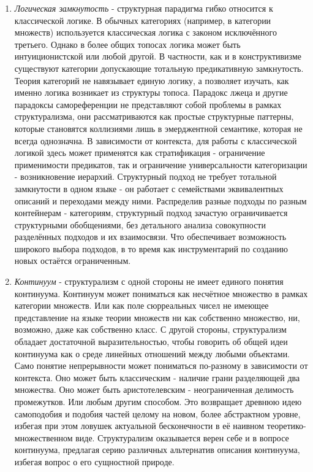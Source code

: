 \documentclass[12pt]{article}
\begin{document}
\begin{enumerate}
    \item {\it Логическая замкнутость} - структурная парадигма гибко относится к классической логике. В обычных категориях (например, в категории множеств) используется классическая логика с законом исключённого третьего. Однако в более общих топосах логика может быть интуиционистской или любой другой. В частности, как и в конструктивизме существуют категории допускающие тотальную предикативную замкнутость. Теория категорий не навязывает единую логику, а позволяет изучать, как именно логика возникает из структуры топоса. Парадокс лжеца и другие парадоксы самореференции не представляют собой проблемы в рамках структурализма, они рассматриваются как простые структурные паттерны, которые становятся коллизиями лишь в эмерджентной семантике, которая не всегда однозначна. В зависимости от контекста, для работы с классической логикой здесь может применятся как стратификация - ограничение применимости предикатов, так и ограничение универсальности категоризации - возникновение иерархий. Структурный подход не требует тотальной замкнутости в одном языке - он работает с семействами эквивалентных описаний и переходами между ними. Распределив разные подходы по разным контейнерам - категориям, структурный подход зачастую ограничивается структурными обобщениями, без детального анализа совокупности разделённых подходов и их взаимосвязи. Что обеспечивает возможность широкого выбора подходов, в то время как инструментарий по созданию новых остаётся ограниченным.
    \item {\it Континуум} - структурализм с одной стороны не имеет единого понятия континуума. Континуум может пониматься как несчётное множество в рамках категории множеств. Или как поле сюрреальных чисел не имеющее представление на языке теории множеств ни как собственно множество, ни, возможно, даже как собственно класс. С другой стороны, структурализм обладает достаточной выразительностью, чтобы говорить об общей идеи континуума как о среде линейных отношений между любыми объектами. Само понятие непрерывности может пониматься по-разному в зависимости от контекста. Оно может быть классическим - наличие грани разделяющей два множества. Оно может быть аристотелевским - неограниченная делимость промежутков. Или любым другим способом. Это возвращает древнюю идею самоподобия и подобия частей целому на новом, более абстрактном уровне, избегая при этом ловушек актуальной бесконечности в её наивном теоретико-множественном виде. Структурализм оказывается верен себе и в вопросе континуума, предлагая серию различных альтернатив описания континуума, избегая вопрос о его сущностной природе.

\end{enumerate}
\end{document}
